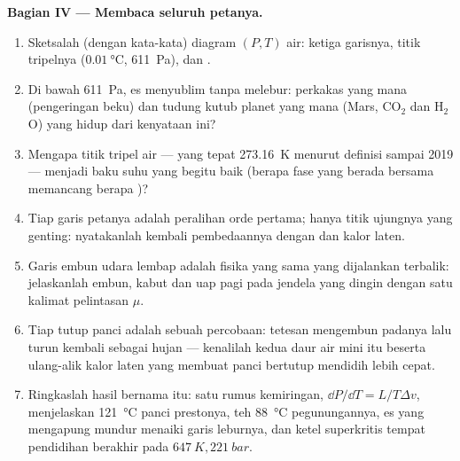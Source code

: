 \begin{problem}
\medskip\noindent\textbf{Bagian IV --- Membaca seluruh petanya.}
\begin{enumerate}[resume]
  \item Sketsalah (dengan kata-kata) diagram $(P, T)$ air: ketiga
        garisnya, titik tripelnya ($\qty{0.01}{\celsius}$,
        \qty{611}{Pa}), dan .
  \item Di bawah \qty{611}{Pa}, es menyublim tanpa melebur: perkakas
        yang mana (pengeringan beku) dan tudung kutub planet yang mana
        (Mars, CO$_2$ dan H$_2$O) yang hidup dari kenyataan ini?
  \item Mengapa titik tripel air --- yang tepat
        \qty{273.16}{K} menurut definisi sampai 2019 --- menjadi baku
        suhu yang begitu baik (berapa fase yang berada bersama memancang
        berapa )?
  \item Tiap garis petanya adalah peralihan orde pertama; hanya titik
        ujungnya yang genting: nyatakanlah kembali pembedaannya dengan
         dan kalor laten.
  \item Garis embun udara lembap adalah fisika yang sama yang dijalankan
        terbalik: jelaskanlah embun, kabut dan uap pagi pada jendela yang
        dingin dengan satu kalimat pelintasan $\mu$.
  \item Tiap tutup panci adalah sebuah percobaan: tetesan mengembun
        padanya lalu turun kembali sebagai hujan --- kenalilah kedua
         daur air mini itu beserta ulang-alik kalor laten
        yang membuat panci bertutup mendidih lebih cepat.
  \item Ringkaslah hasil bernama itu: satu rumus kemiringan, $\dd P/
        \dd T = L/T\Delta v$, menjelaskan \qty{121}{\celsius} panci
        prestonya, teh \qty{88}{\celsius} pegunungannya, es yang
        mengapung mundur menaiki garis leburnya, dan ketel superkritis
        tempat pendidihan berakhir pada
        $\qty{647}{K}, \qty{221}{bar}$.
\end{enumerate}
\end{problem}
